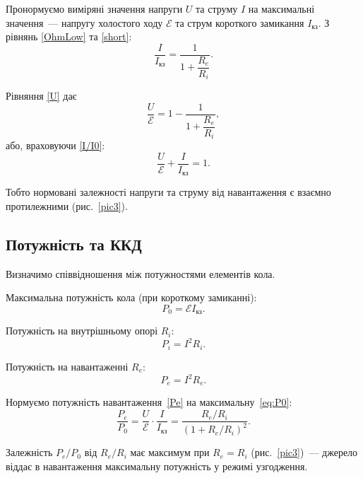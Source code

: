 Пронормуємо виміряні значення напруги $U$ та струму $I$ на максимальні значення~--- напругу холостого ходу $\mathcal{E}$ та струм короткого замикання $I_\text{кз}$. З рівнянь \eqref{OhmLow} та \eqref{short}:
\begin{equation}\label{I/I0}
	\frac{I}{I_\text{кз}} = \frac{1}{1 + \dfrac{R_e}{R_i}}.
\end{equation}

Рівняння \eqref{U} дає
\begin{equation}\label{Г/Г0}
	\frac{U}{\mathcal{E}} = 1 - \frac{1}{1 + \dfrac{R_e}{R_i}},
\end{equation}
або, враховуючи \eqref{I/I0}:
\begin{equation}
	\frac{U}{\mathcal{E}} + \frac{I}{I_\text{кз}}  = 1.
\end{equation}

Тобто нормовані залежності напруги та струму від навантаження є взаємно протилежними (рис.~\ref{pic3}).

\subsection{Потужність та ККД}

Визначимо співвідношення між потужностями елементів кола.

Максимальна потужність кола (при короткому замиканні):
\begin{equation}\label{eq:P0}
    P_0 = \mathcal{E} I_\text{кз}.
\end{equation}

Потужність на внутрішньому опорі $R_i$:
\begin{equation}\label{Pi}
	P_i = I^2R_i.
\end{equation}

Потужність на навантаженні $R_e$:
\begin{equation}\label{Pe}
	P_e = I^2R_e.
\end{equation}

Нормуємо потужність навантаження~\eqref{Pe} на максимальну~\eqref{eq:P0}:
\begin{equation}\label{Pe/P0}
	\frac{P_e}{P_0} = \frac{U}{\mathcal{E}} \cdot \frac{I}{I_\text{кз}} = \frac{R_e/R_i}{\left( 1+ R_e/R_i \right)^2 }.
\end{equation}

Залежність $P_e/P_0$ від $R_e/R_i$ має максимум при $R_e=R_i$ (рис.~\ref{pic3})~--- джерело віддає в навантаження максимальну потужність у режимі узгодження.

